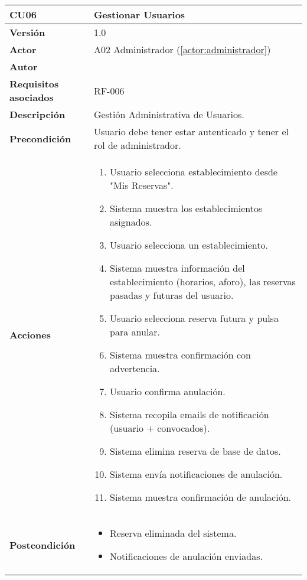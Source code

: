 \begin{table}[H]
	\centering
	\begin{tabularx}{\linewidth}{ p{} p{} }
		\toprule
		\textbf{CU06}    & \textbf{Gestionar Usuarios} \\
		\toprule
		\textbf{Versión}              & 1.0    \\
		\textbf{Actor}                & A02 Administrador (\ref{actor:administrador}) \\
		\textbf{Autor}                & \nombre \\
		\textbf{Requisitos asociados} & RF-006 \\
		\textbf{Descripción}          & Gestión Administrativa de Usuarios. \\
		\textbf{Precondición}         & Usuario debe tener estar autenticado y tener el rol de administrador. \\
		\textbf{Acciones}             &
		\begin{enumerate}
			\def\labelenumi{\arabic{enumi}.}
			\tightlist
			\item Usuario selecciona establecimiento desde "Mis Reservas".
            \item Sistema muestra los establecimientos asignados.
            \item Usuario selecciona un establecimiento.
            \item Sistema muestra información del establecimiento (horarios, aforo), las reservas pasadas y futuras del usuario.
            \item Usuario selecciona reserva futura y pulsa para anular.
            \item Sistema muestra confirmación con advertencia.
            \item Usuario confirma anulación.
            \item Sistema recopila emails de notificación (usuario + convocados).
            \item Sistema elimina reserva de base de datos.
            \item Sistema envía notificaciones de anulación.
            \item Sistema muestra confirmación de anulación.
		\end{enumerate}\\
		\textbf{Postcondición}        &
   		\begin{itemize}
  			\item Reserva eliminada del sistema.
			  \item Notificaciones de anulación enviadas.

\end{itemize}
\end{tabularx}
\end{table}

